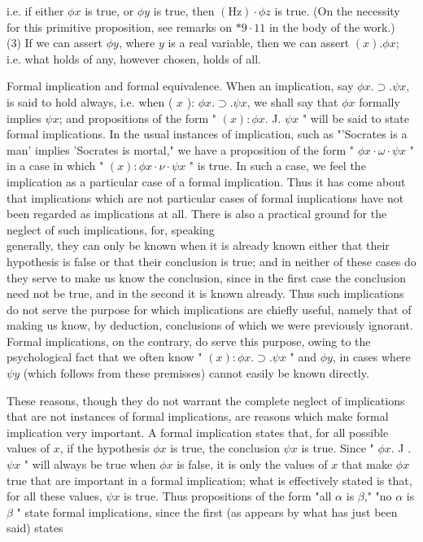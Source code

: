 \documentclass[10pt]{article}
\begin{document}
i.e. if either $\phi x$ is true, or $\phi y$ is true, then $(\mathrm{Hz}) \cdot \phi z$ is true. (On the necessity for this primitive proposition, see remarks on $* 9 \cdot 11$ in the body of the work.)\\
(3) If we can assert $\phi y$, where $y$ is a real variable, then we can assert $(x) . \phi x$; i.e. what holds of any, however chosen, holds of all.

Formal implication and formal equivalence. When an implication, say $\phi x . \supset . \psi x$, is said to hold always, i.e. when ( $x$ ): $\phi x . \supset . \psi x$, we shall say that $\phi x$ formally implies $\psi x$; and propositions of the form " $(x): \phi x$. J. $\psi x$ " will be said to state formal implications. In the usual instances of implication, such as "'Socrates is a man' implies 'Socrates is mortal," we have a proposition of the form " $\phi x \cdot \omega \cdot \psi x$ " in a case in which " $(x): \phi x \cdot \nu \cdot \psi x$ " is true. In such a case, we feel the implication as a particular case of a formal implication. Thus it has come about that implications which are not particular cases of formal implications have not been regarded as implications at all. There is also a practical ground for the neglect of such implications, for, speaking\\
generally, they can only be known when it is already known either that their hypothesis is false or that their conclusion is true; and in neither of these cases do they serve to make us know the conclusion, since in the first case the conclusion need not be true, and in the second it is known already. Thus such implications do not serve the purpose for which implications are chiefly useful, namely that of making us know, by deduction, conclusions of which we were previously ignorant. Formal implications, on the contrary, do serve this purpose, owing to the psychological fact that we often know " $(x): \phi x . \supset . \psi x$ " and $\phi y$, in cases where $\psi y$ (which follows from these premisses) cannot easily be known directly.

These reasons, though they do not warrant the complete neglect of implications that are not instances of formal implications, are reasons which make formal implication very important. A formal implication states that, for all possible values of $x$, if the hypothesis $\phi x$ is true, the conclusion $\psi x$ is true. Since " $\phi x$. J . $\psi x$ " will always be true when $\phi x$ is false, it is only the values of $x$ that make $\phi x$ true that are important in a formal implication; what is effectively stated is that, for all these values, $\psi x$ is true. Thus propositions of the form "all $\alpha$ is $\beta$," "no $\alpha$ is $\beta$ " state formal implications, since the first (as appears by what has just been said) states
\end{document}
